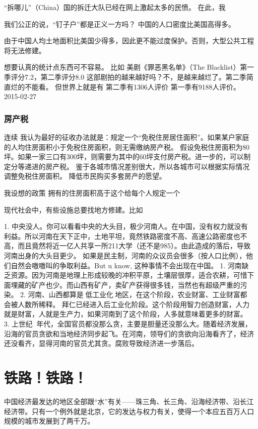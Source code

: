 “拆哪儿”（China）国的拆迁大队已经在网上激起太多的民愤。
在此，我

我们公正的说，“钉子户”都是正义一方吗？
中国的人口密度比美国高得多。

由于中国人均土地面积比美国少得多，因此更不能过度保护。否则，大型公共工程将无法修建。

想要认真的统计点东西可不容易。
比如
美剧《罪恶黑名单》（The Blacklist）第一季评分7.2，第二季评分8.0
这部剧拍的越来越好吗？不，是越来越烂了。第二季简直烂的不能看。
但世界上就是有
第二季有1306人评价
第一季有9188人评价。
2015-02-27

\subsubsection{房产税}
连续
我认为最好的征收办法就是：规定一个“免税住房居住面积”。如果某户家庭的人均住房面积小于免税住房面积，则无需缴纳房产税。
假设免税住房面积为80坪。如果一家三口有300坪，则需要为其中的60坪支付房产税。进一步的，可以制定分等递进的房产税。
鉴于各城市情况差别很大，所以各城市可以根据实际情况调整免税住房面积。
降低市民购买多套房产的愿望。

我设想的政策
拥有的住房面积高于这个给每个人规定一个

现代社会中，有些设施总要找地方修建。比如

1. 中央没人。你可以看看中央的大头目，极少河南人。在中国，没有权力就没有利益。所以河南在天下正中，土地平坦，竟然铁路密度不高、高速公路密度也不高，而且竟然将近一亿人共享一所211大学（还不是985）。由此造成的落后，导致河南出身的大头目更少。
如果是民主制，河南的众议员会很多（按人口比例），他们自然会嗷嗷叫的争取利益。But u know, 这种事情不会出现在中国。
1.	河南缺乏资源。因为河南是地理上形成较晚的冲积平原，土壤层很厚，适合农耕，可惜下面埋藏的矿产也少。而山西有矿产，卖矿产获得很多钱，当然也有超级严重的污染。
2.	河南、山西都算是低工业化地区，在这个阶段，农业财富、工业财富都会被人数所稀释。
拜仁已经进入后工业化阶段。这个阶段用智力创造财富，人力就是财富，人就是生产力，如果河南到了这个阶段，人多就意味着更多的财富。
3.	上世纪年代，全国官员都没那么贪，主要是胆量还没那么大。随着经济发展，沿海的官员贪欲和当地经济同步起飞。在河南，领导们的贪欲向沿海看齐了，经济还没看齐，显得河南的官员尤其贪。腐败导致经济进一步落后。

\section{铁路！铁路！}

中国经济最发达的地区全部跟“水”有关——珠三角、长三角、沿海经济带、沿长江经济带。只有一个例外就是北京，它的发达与权力有关，使得一个本应五百万人口规模的城市发展到了两千万。

